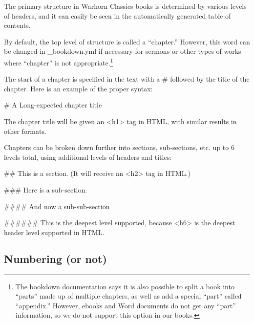 \documentclass[
]{book}
\newenvironment{Shaded}{\begin{snugshade}}{\end{snugshade}}
\newcommand{\FunctionTok}[1]{\textcolor[rgb]{0.00,0.00,0.00}{#1}}
\begin{document}
The primary structure in Warhorn Classics books is determined by various levels of headers, and it can easily be seen in the automatically generated table of contents.

By default, the top level of structure is called a ``chapter.'' However, this word can be changed in \_bookdown.yml if necessary for sermons or other types of works where ``chapter'' is not appropriate.\footnote{The bookdown documentation says it is \href{https://bookdown.org/yihui/bookdown/markdown-extensions-by-bookdown.html\#special-headers}{also possible} to split a book into ``parts'' made up of multiple chapters, as well as add a special ``part'' called ``appendix.'' However, ebooks and Word documents do not get any ``part'' information, so we do not support this option in our books.}

The start of a chapter is specified in the text with a \# followed by the title of the chapter. Here is an example of the proper syntax:

\begin{Shaded}
\begin{Highlighting}[]
\FunctionTok{\# A Long{-}expected chapter title}
\end{Highlighting}
\end{Shaded}

The chapter title will be given an \textless h1\textgreater{} tag in HTML, with similar results in other formats.

Chapters can be broken down further into sections, sub-sections, etc. up to 6 levels total, using additional levels of headers and titles:

\begin{Shaded}
\begin{Highlighting}[]
\FunctionTok{\#\# This is a section. (It will receive an \textless{}h2\textgreater{} tag in HTML.)}

\FunctionTok{\#\#\# Here is a sub{-}section.}

\FunctionTok{\#\#\#\# And now a sub{-}sub{-}section}

\FunctionTok{\#\#\#\#\#\# This is the deepest level supported, because \textless{}h6\textgreater{} is the deepest header level supported in HTML.}
\end{Highlighting}
\end{Shaded}

\hypertarget{numbering-or-not}{%
\subsection{Numbering (or not)}\label{numbering-or-not}}
\end{document}
